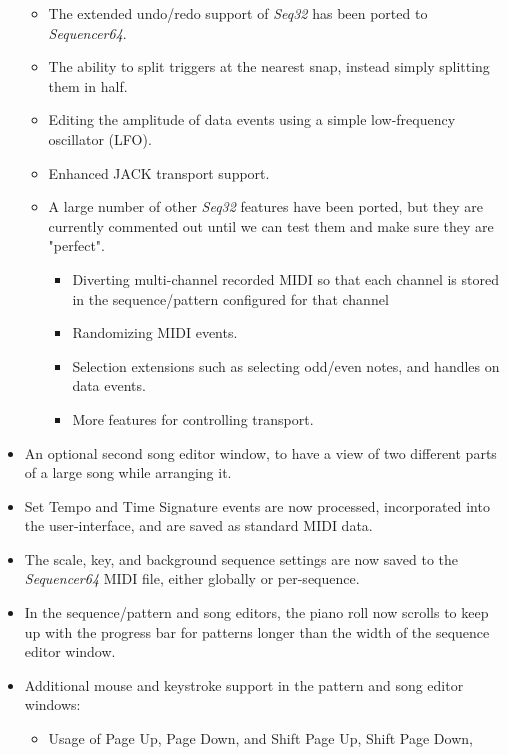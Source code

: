 \documentclass[
 11pt,
 twoside,
 a4paper,
 headinclude,
 footinclude,
 final                                 %
]{article}
\begin{document}
\begin{itemize}
\begin{itemize}
         \item The extended undo/redo support of \textsl{Seq32} has been
            ported to \textsl{Sequencer64}.
         \item The ability to split triggers at the nearest snap, instead
            simply splitting them in half.
         \item Editing the amplitude of data events using a simple
            low-frequency oscillator (LFO).
         \item Enhanced JACK transport support.
         \item A large number of other \textsl{Seq32} features have been
            ported, but they are currently commented out until we can test them
            and make sure they are "perfect".
         \begin{itemize}
            \item Diverting multi-channel recorded MIDI so that each channel
               is stored in the sequence/pattern configured for that channel
            \item Randomizing MIDI events.
            \item Selection extensions such as selecting odd/even notes, and
               handles on data events.
            \item More features for controlling transport.
         \end{itemize}
      \end{itemize}
      \item An optional second song editor window, to have a view
         of two different parts of a large song while arranging it.
      \item Set Tempo and Time Signature events are
         now processed, incorporated into the user-interface, and are saved
         as standard MIDI data.
      \item The scale, key, and background sequence
         settings are now saved to the \textsl{Sequencer64} MIDI file, either
         globally or per-sequence.
      \item In the sequence/pattern and song editors, the piano roll
         now scrolls to keep up with the progress bar for patterns longer than
         the width of the sequence editor window.
      \item Additional mouse and keystroke support in the pattern and song
         editor windows:
      \begin{itemize}
         \item Usage of Page Up, Page Down, and Shift Page Up, Shift Page Down,

\end{itemize}
\end{itemize}
\end{document}
